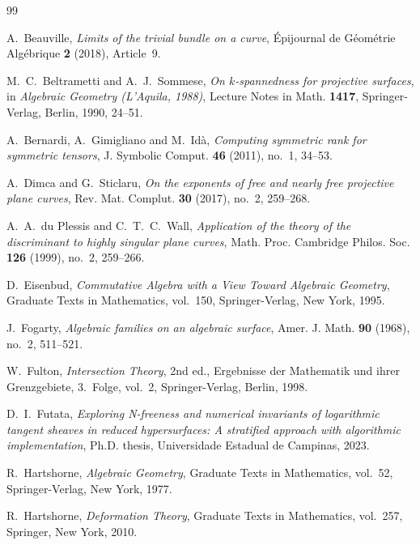 \documentclass[11pt]{amsart} %
\theoremstyle{definition}
\begin{document}
\begin{thebibliography}{99}

A.~Beauville,
\emph{Limits of the trivial bundle on a curve},
\'Epijournal de G\'eom\'etrie Alg\'ebrique
\textbf{2} (2018), Article~9.

M.~C.~Beltrametti and A.~J.~Sommese,
\emph{On $k$-spannedness for projective surfaces},
in \emph{Algebraic Geometry (L'Aquila, 1988)},
Lecture Notes in Math. \textbf{1417},
Springer-Verlag, Berlin, 1990, 24--51.

A.~Bernardi, A.~Gimigliano and M.~Id\`a,
\emph{Computing symmetric rank for symmetric tensors},
J. Symbolic Comput. \textbf{46} (2011), no.~1, 34--53.

A.~Dimca and G.~Sticlaru,
\emph{On the exponents of free and nearly free projective plane curves},
Rev. Mat. Complut. \textbf{30} (2017), no.~2, 259--268.

A.~A.~du Plessis and C.~T.~C.~Wall,
\emph{Application of the theory of the discriminant to highly
singular plane curves},
Math. Proc. Cambridge Philos. Soc.
\textbf{126} (1999), no.~2, 259--266.

D.~Eisenbud,
\emph{Commutative Algebra with a View Toward Algebraic Geometry},
Graduate Texts in Mathematics, vol.~150,
Springer-Verlag, New York, 1995.

J.~Fogarty,
\emph{Algebraic families on an algebraic surface},
Amer. J. Math. \textbf{90} (1968), no.~2, 511--521.

W.~Fulton,
\emph{Intersection Theory},
2nd ed.,
Ergebnisse der Mathematik und ihrer Grenzgebiete,
3.~Folge, vol.~2,
Springer-Verlag, Berlin, 1998.

D.~I.~Futata,
\emph{Exploring N-freeness and numerical invariants of logarithmic
tangent sheaves in reduced hypersurfaces: A stratified approach with
algorithmic implementation},
Ph.D. thesis, Universidade Estadual de Campinas, 2023.

R.~Hartshorne,
\emph{Algebraic Geometry},
Graduate Texts in Mathematics, vol.~52,
Springer-Verlag, New York, 1977.

R.~Hartshorne,
\emph{Deformation Theory},
Graduate Texts in Mathematics, vol.~257,
Springer, New York, 2010.


\end{thebibliography}
\end{document}

